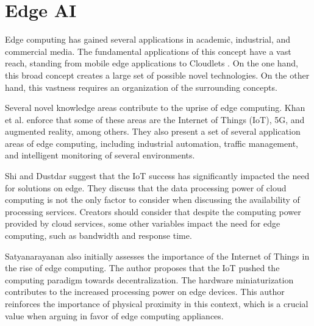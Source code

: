 \chapter{Edge AI}
\label{chap:establishing}


Edge computing has gained several applications in academic, industrial, and commercial media. The fundamental applications of this concept have a vast reach, standing from mobile edge applications to Cloudlets \cite{khan2019edge}. On the one hand, this broad concept creates a large set of possible novel technologies. On the other hand, this vastness requires an organization of the surrounding concepts.

Several novel knowledge areas contribute to the uprise of edge computing. Khan et al. \cite{khan2019edge} enforce that some of these areas are the Internet of Things (IoT), 5G, and augmented reality, among others. They also present a set of several application areas of edge computing, including industrial automation, traffic management, and intelligent monitoring of several environments.

Shi and Dustdar \cite{shi2016promise} suggest that the IoT success has significantly impacted the need for solutions on edge. They discuss that the data processing power of cloud computing is not the only factor to consider when discussing the availability of processing services. Creators should consider that despite the computing power provided by cloud services, some other variables impact the need for edge computing, such as bandwidth and response time.

Satyanarayanan \cite{satyanarayanan2017emergence} also initially assesses the importance of the Internet of Things in the rise of edge computing. The author proposes that the IoT pushed the computing paradigm towards decentralization. The hardware miniaturization contributes to the increased processing power on edge devices. This author reinforces the importance of physical proximity in this context, which is a crucial value when arguing in favor of edge computing appliances.

